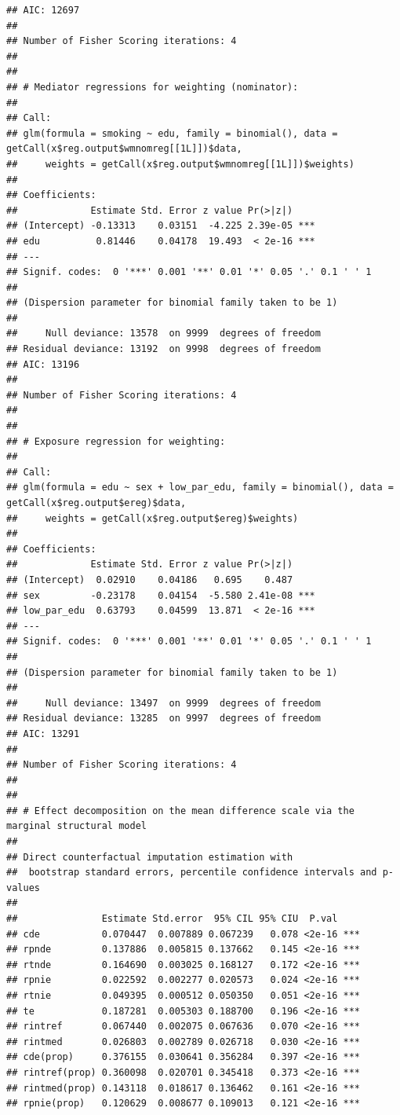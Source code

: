 \documentclass[
]{book}
\begin{document}
\begin{verbatim}
## AIC: 12697
## 
## Number of Fisher Scoring iterations: 4
## 
## 
## # Mediator regressions for weighting (nominator): 
## 
## Call:
## glm(formula = smoking ~ edu, family = binomial(), data = getCall(x$reg.output$wmnomreg[[1L]])$data, 
##     weights = getCall(x$reg.output$wmnomreg[[1L]])$weights)
## 
## Coefficients:
##             Estimate Std. Error z value Pr(>|z|)    
## (Intercept) -0.13313    0.03151  -4.225 2.39e-05 ***
## edu          0.81446    0.04178  19.493  < 2e-16 ***
## ---
## Signif. codes:  0 '***' 0.001 '**' 0.01 '*' 0.05 '.' 0.1 ' ' 1
## 
## (Dispersion parameter for binomial family taken to be 1)
## 
##     Null deviance: 13578  on 9999  degrees of freedom
## Residual deviance: 13192  on 9998  degrees of freedom
## AIC: 13196
## 
## Number of Fisher Scoring iterations: 4
## 
## 
## # Exposure regression for weighting: 
## 
## Call:
## glm(formula = edu ~ sex + low_par_edu, family = binomial(), data = getCall(x$reg.output$ereg)$data, 
##     weights = getCall(x$reg.output$ereg)$weights)
## 
## Coefficients:
##             Estimate Std. Error z value Pr(>|z|)    
## (Intercept)  0.02910    0.04186   0.695    0.487    
## sex         -0.23178    0.04154  -5.580 2.41e-08 ***
## low_par_edu  0.63793    0.04599  13.871  < 2e-16 ***
## ---
## Signif. codes:  0 '***' 0.001 '**' 0.01 '*' 0.05 '.' 0.1 ' ' 1
## 
## (Dispersion parameter for binomial family taken to be 1)
## 
##     Null deviance: 13497  on 9999  degrees of freedom
## Residual deviance: 13285  on 9997  degrees of freedom
## AIC: 13291
## 
## Number of Fisher Scoring iterations: 4
## 
## 
## # Effect decomposition on the mean difference scale via the marginal structural model
##  
## Direct counterfactual imputation estimation with 
##  bootstrap standard errors, percentile confidence intervals and p-values 
##  
##               Estimate Std.error  95% CIL 95% CIU  P.val    
## cde           0.070447  0.007889 0.067239   0.078 <2e-16 ***
## rpnde         0.137886  0.005815 0.137662   0.145 <2e-16 ***
## rtnde         0.164690  0.003025 0.168127   0.172 <2e-16 ***
## rpnie         0.022592  0.002277 0.020573   0.024 <2e-16 ***
## rtnie         0.049395  0.000512 0.050350   0.051 <2e-16 ***
## te            0.187281  0.005303 0.188700   0.196 <2e-16 ***
## rintref       0.067440  0.002075 0.067636   0.070 <2e-16 ***
## rintmed       0.026803  0.002789 0.026718   0.030 <2e-16 ***
## cde(prop)     0.376155  0.030641 0.356284   0.397 <2e-16 ***
## rintref(prop) 0.360098  0.020701 0.345418   0.373 <2e-16 ***
## rintmed(prop) 0.143118  0.018617 0.136462   0.161 <2e-16 ***
## rpnie(prop)   0.120629  0.008677 0.109013   0.121 <2e-16 ***

\end{verbatim}
\end{document}
